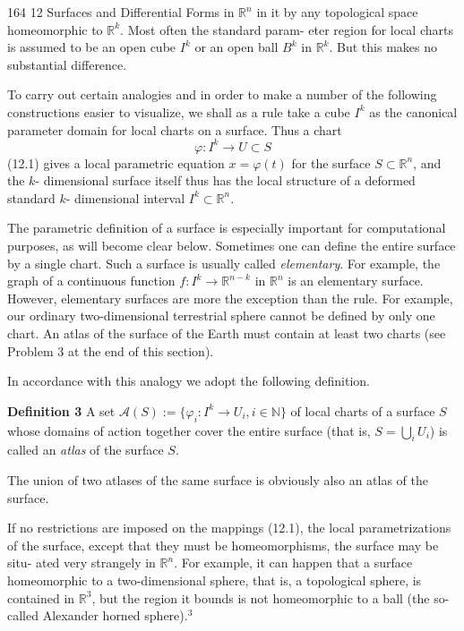 164
\hfill
12 Surfaces and Differential Forms in $\mathbb{R}^n$
in it by any topological space homeomorphic to $\mathbb{R}^k$. Most often the standard param-
eter region for local charts is assumed to be an open cube $I^k$ or an open ball $B^k$
in $\mathbb{R}^k$. But this makes no substantial difference.

\noindent
To carry out certain analogies and in order to make a number of the following
constructions easier to visualize, we shall as a rule take a cube $I^k$ as the canonical
parameter domain for local charts on a surface. Thus a chart
\[
\varphi: I^k \to U \subset S
\]
(12.1)
gives a local parametric equation $x = \varphi(t)$ for the surface $S \subset \mathbb{R}^n$, and the $k$-
dimensional surface itself thus has the local structure of a deformed standard $k$-
dimensional interval $I^k \subset \mathbb{R}^n$.

\noindent
The parametric definition of a surface is especially important for computational
purposes, as will become clear below. Sometimes one can define the entire surface
by a single chart. Such a surface is usually called \textit{elementary}. For example, the graph
of a continuous function $f: I^k \to \mathbb{R}^{n-k}$ in $\mathbb{R}^n$ is an elementary surface. However,
elementary surfaces are more the exception than the rule. For example, our ordinary
two-dimensional terrestrial sphere cannot be defined by only one chart. An atlas of
the surface of the Earth must contain at least two charts (see Problem 3 at the end of
this section).

\noindent
In accordance with this analogy we adopt the following definition.

\noindent
\textbf{Definition 3} A set $\mathcal{A}(S) := \{\varphi_i: I^k \to U_i, i \in \mathbb{N}\}$ of local charts of a surface $S$
whose domains of action together cover the entire surface (that is, $S = \bigcup_i U_i$) is
called an \textit{atlas} of the surface $S$.

\noindent
The union of two atlases of the same surface is obviously also an atlas of the
surface.

\noindent
If no restrictions are imposed on the mappings (12.1), the local parametrizations
of the surface, except that they must be homeomorphisms, the surface may be situ-
ated very strangely in $\mathbb{R}^n$. For example, it can happen that a surface homeomorphic
to a two-dimensional sphere, that is, a topological sphere, is contained in $\mathbb{R}^3$, but
the region it bounds is not homeomorphic to a ball (the so-called Alexander horned
sphere).$^3$

